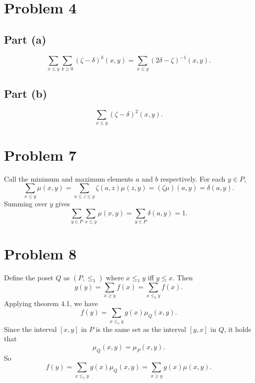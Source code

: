 \documentclass{article}
\begin{document}
\section*{Problem 4}
\subsection*{Part (a)}
$$\sum_{x\le y}\sum_{k\ge 0}(\zeta - \delta)^k(x, y) = \sum_{x \le y}(2\delta - \zeta)^{-1}(x, y).$$

\subsection*{Part (b)}
$$\sum_{x\le y}(\zeta - \delta)^2(x, y).$$

\section*{Problem 7}
Call the minimum and maximum elements $a$ and $b$ respectively. For each $y \in P$,
$$\sum_{x \le y} \mu(x, y) = \sum_{a \le z \le y}\zeta(a, z)\mu(z, y) = (\zeta\mu)(a, y) = \delta(a, y).$$
Summing over $y$ gives
$$\sum_{y\in P}\sum_{x \le y}\mu(x, y) = \sum_{y\in P} \delta(a, y) = 1.$$

\section*{Problem 8}
Define the poset $Q$ as $(P, \le_1)$ where $x \le_1 y$ iff $y \le x$. Then
$$g(y) = \sum_{x\ge y}f(x) = \sum_{x\le_1y}f(x).$$
Applying theorem 4.1, we have
$$f(y) = \sum_{x\le_1y} g(x)\mu_Q(x, y).$$
Since the interval $[x, y]$ in $P$ is the same set as the interval $[y, x]$ in $Q$, it holds that
$$\mu_Q(x, y) = \mu_P(x, y).$$
So
$$f(y) = \sum_{x\le_1y} g(x)\mu_Q(x, y) = \sum_{x\ge y} g(x)\mu(x, y).$$
\end{document}
